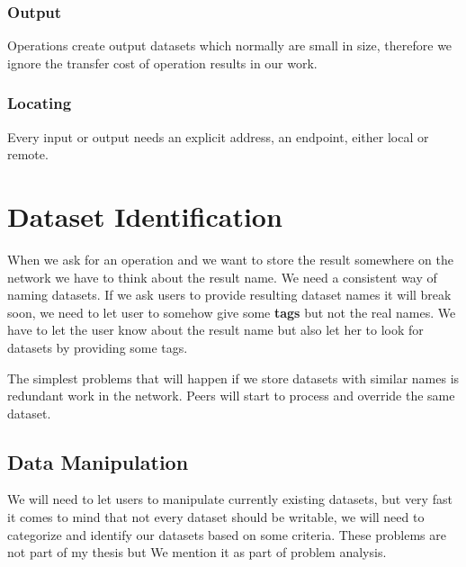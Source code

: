 \subsubsection{Output}
Operations create output datasets which normally are small in size, therefore we ignore the transfer cost of operation
results in our work.

\subsubsection{Locating}
Every input or output needs an explicit address, an endpoint, either local or remote.

\section{Dataset Identification}
When we ask for an operation and we want to store the result somewhere on the network we have to think about the result name. 
We need a consistent way of naming datasets. If we ask users to provide resulting dataset names it will break soon, we need to 
let user to somehow give some \textbf{tags} but not the real names. We have to let the user know about the result name but also
let her to look for datasets by providing some tags.

The simplest problems that will happen if we store datasets with similar names is redundant work in the network. Peers will start 
to process and override the same dataset.

\subsection{Data Manipulation}
We will need to let users to manipulate currently existing datasets, but very fast it comes to mind that not every dataset should be
writable, we will need to categorize and identify our datasets based on some criteria. These problems are not part of my thesis but
We mention it as part of problem analysis.


